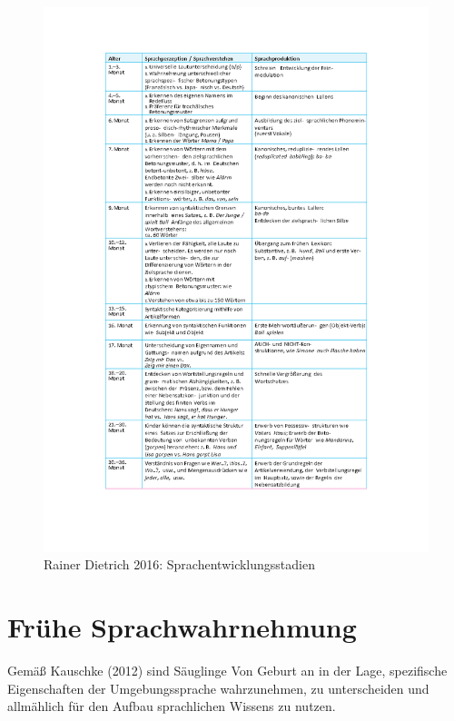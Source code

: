 \documentclass[
  letterpaper,
]{scrbook}
\begin{document}
\begin{figure}

{\centering \includegraphics[width=1\textwidth,height=\textheight]{./pictures/Erstsprachliche_Entwicklung_Tab6_Rainer-Dietrich2016.png}

}

\caption{Rainer Dietrich 2016: Sprachentwicklungsstadien}

\end{figure}

\hypertarget{fruxfche-sprachwahrnehmung}{%
\section{Frühe Sprachwahrnehmung}\label{fruxfche-sprachwahrnehmung}}

Gemäß Kauschke (2012) sind Säuglinge Von Geburt an in der Lage,
spezifische Eigenschaften der Umgebungssprache wahrzunehmen, zu
unterscheiden und allmählich für den Aufbau sprachlichen Wissens zu
nutzen.
\end{document}
